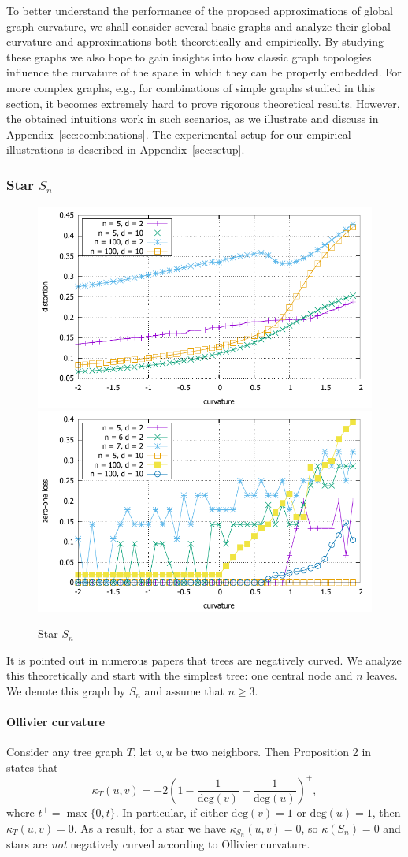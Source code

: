 \documentclass{article} %
\begin{document}
To better understand the performance of the proposed approximations of global graph curvature,
we shall consider several basic graphs and analyze their global curvature and approximations both theoretically and empirically. By studying these graphs we also hope to gain insights into how classic graph topologies influence the curvature of the space in which they can be properly embedded. For more complex graphs, e.g., for combinations of simple graphs studied in this section, it becomes extremely hard to prove rigorous theoretical results. However, the obtained intuitions work in such scenarios, as we illustrate and discuss in Appendix~\ref{sec:combinations}. The experimental setup for our empirical illustrations is described in Appendix~\ref{sec:setup}. 

\subsubsection{Star $S_n$}\label{sec:S_n}

\begin{figure}
    \centering
    \includegraphics[width = 0.49 \textwidth]{star_distortion.pdf}
    \includegraphics[width = 0.49 \textwidth]{star_zero_one.pdf}
    \caption{Star $S_n$}
    \label{fig:star}
\end{figure}

It is pointed out in numerous papers that trees are negatively curved. 
We analyze this theoretically and start with the simplest tree: one central node and $n$ leaves. We denote this graph by $S_n$ and assume that $n \ge 3$.

\paragraph{Ollivier curvature} 
Consider any tree graph $T$, let $v, u$ be two neighbors. Then Proposition 2 in~\citep{jost2014ollivier} states that
\begin{equation}\label{eq:ollivier_tree}
	\kappa_T(u,v) = -2\left(1 - \frac{1}{\mathrm{deg}(v)} - \frac{1}{\mathrm{deg}(u)}\right)^+, 
\end{equation}
where $t^+ = \max\{0,t\}$. In particular, if either $\mathrm{deg}(v) = 1$ or $\mathrm{deg}(u) = 1$, then $\kappa_T(u,v) = 0$.  As a result, for a star we have $\kappa_{S_n}(u,v) = 0$, so $\kappa(S_n) = 0$ and stars are \textit{not} negatively curved according to Ollivier curvature.
\end{document}
